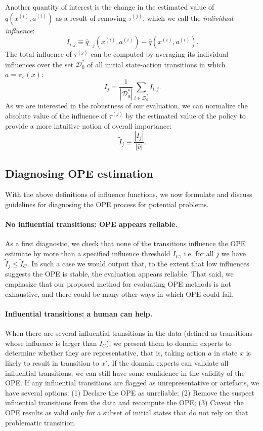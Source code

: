 \documentclass{article}
\begin{document}
Another quantity of interest is the change in the estimated value of $q(x^{(i)}, a^{(i)})$ as a result of removing $\tau^{(j)}$, which we call the \emph{individual influence}:
\begin{equation}
    I_{i, j} \equiv \hat{q}_{-j}(x^{(i)}, a^{(i)}) - \hat{q}(x^{(i)}, a^{(i)}).
\end{equation}
The total influence of $\tau^{(j)}$ can be computed by averaging its individual influences over the set $\mathcal{D}^*_0$ of all initial state-action transitions in which $a=\pi_e(x)$: 
\begin{equation}
    I_j = \frac{1}{|\mathcal{D}^*_0|} \sum_{i \in \mathcal{D}^*_0} I_{i, j}.
\end{equation}
As we are interested in the robustness of our evaluation, we can normalize the absolute value of the influence of $\tau^{(j)}$ by the estimated value of the policy to provide a more intuitive notion of overall importance:
\begin{equation}
    \tilde{I}_j \equiv \frac{|I_j|}{|\hat{v}|}.
\end{equation}

\subsection{Diagnosing OPE estimation}

With the above definitions of influence functions, we now formulate and discuss guidelines for diagnosing the OPE process for potential problems. 

\paragraph{No influential transitions: OPE appears reliable.}  
As a first diagnostic, we check that none of the transitions influence the OPE estimate by more than a specified influence threshold $\tilde{I}_C$, i.e. for all $j$ we have $\tilde{I}_j \leq \tilde{I}_C$. In such a case we would output that, to the extent that low influences suggests the OPE is stable, the evaluation appears reliable. That said, we emphasize that our proposed method for evaluating OPE methods is not exhaustive, and there could be many other ways in which OPE could fail.

\paragraph{Influential transitions: a human can help.}
When there are several influential transitions in the data (defined as transitions whose influence is larger than $\tilde{I}_C$), we present them to domain experts to determine whether they are representative, that is, taking action $a$ in state $x$ is likely to result in transition to $x'$.  If the domain experts can validate all influential transitions, we can still have some confidence in the validity of the OPE. If any influential transitions are flagged as unrepresentative or artefacts, we have several options: (1) Declare the OPE as unreliable; (2) Remove the suspect influential transitions from the data and recompute the OPE; (3) Caveat the OPE results as valid only for a subset of initial states that do not rely on that problematic transition.
\end{document}
